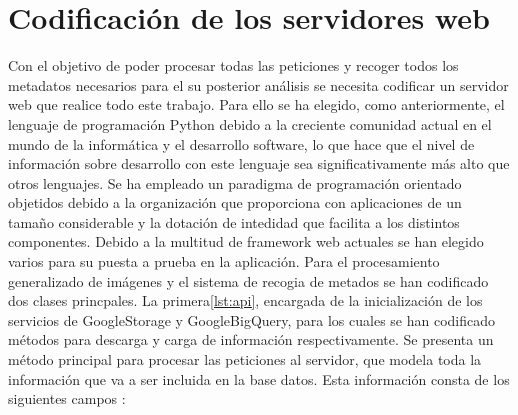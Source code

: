 \section{Codificación de los servidores web}\label{sec:codificación-de-los-servidores-web}
Con el objetivo de poder procesar todas las peticiones y recoger todos los metadatos necesarios para el su posterior análisis se necesita codificar un servidor web que realice todo este trabajo.
Para ello se ha elegido, como anteriormente, el lenguaje de programación Python debido a la creciente comunidad actual en el mundo de la informática y el desarrollo software, lo que hace que el nivel
de información sobre desarrollo con este lenguaje sea significativamente más alto que otros lenguajes.
Se ha empleado un paradigma de programación orientado objetidos debido a la organización que proporciona con aplicaciones de un tamaño considerable y la dotación de intedidad que facilita a los distintos
componentes.
Debido a la multitud de framework web actuales se han elegido varios para su puesta a prueba en la aplicación.
Para el procesamiento generalizado de imágenes y el sistema de recogia de metados se han codificado dos clases princpales.
La primera\ref{lst:api}, encargada de la inicialización de los servicios de GoogleStorage y GoogleBigQuery, para los cuales se han codificado métodos para descarga y carga de información respectivamente.
Se presenta un método principal para procesar las peticiones al servidor, que modela toda la información que va a ser incluida en la base datos.
Esta información consta de los siguientes campos :

